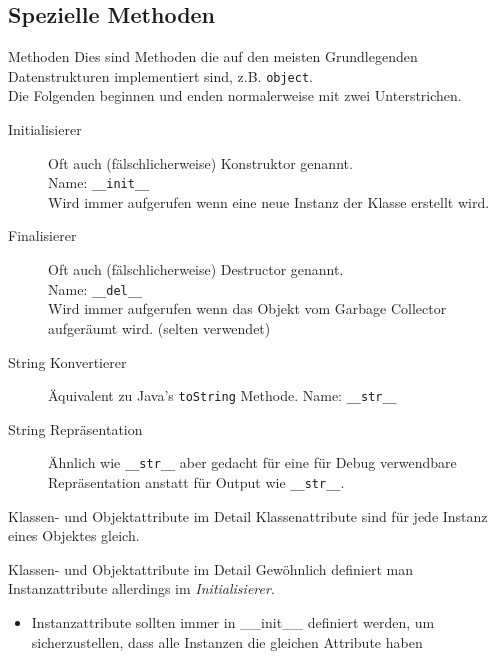 \subsection{Spezielle Methoden}
\begin{frame}[fragile]{Methoden}
	Dies sind Methoden die auf den meisten Grundlegenden Datenstrukturen implementiert sind, z.B. \texttt{object}.\\
	Die Folgenden beginnen und enden normalerweise mit zwei Unterstrichen.

	\begin{description}
		\item[Initialisierer] Oft auch (fälschlicherweise) Konstruktor genannt.\\ Name: \texttt{\_\_init\_\_}\\
			Wird immer aufgerufen wenn eine neue Instanz der Klasse erstellt wird.
		\item[Finalisierer] Oft auch (fälschlicherweise) Destructor genannt.\\
			Name: \texttt{\_\_del\_\_}\\
			Wird immer aufgerufen wenn das Objekt vom Garbage Collector aufgeräumt wird. (selten verwendet)
		\item[String Konvertierer] Äquivalent zu Java's \texttt{toString} Methode. Name: \texttt{\_\_str\_\_}
		\item[String Repräsentation] Ähnlich wie \texttt{\_\_str\_\_} aber gedacht für eine für Debug verwendbare Repräsentation anstatt für Output wie \texttt{\_\_str\_\_}.
	\end{description}
\end{frame}

\begin{frame}[fragile]{Klassen- und Objektattribute im Detail}
	Klassenattribute sind für jede Instanz eines Objektes gleich.
	
\end{frame}

\begin{frame}[fragile]{Klassen- und Objektattribute im Detail}
	Gewöhnlich definiert man Instanzattribute allerdings im \textit{Initialisierer}.
	
	\begin{itemize}
		\item Instanzattribute sollten immer in \_\_init\_\_ definiert werden, um sicherzustellen, dass alle Instanzen die gleichen Attribute haben
	\end{itemize}
\end{frame}



